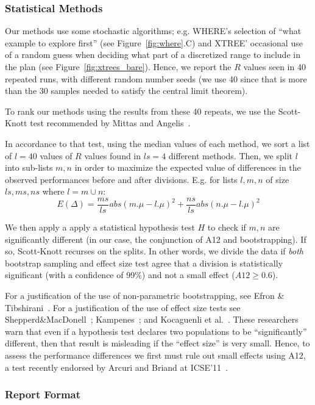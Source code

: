 \documentclass{sig-alternate}
\newcommand{\fig}[1]{Figure~\ref{fig:#1}}
\begin{document}
\subsubsection{Statistical Methods}
Our methods use some stochastic algorithms; e.g. WHERE's selection of ``what example to explore first'' (see \fig{where}.C) and XTREE' occasional use of a random guess when deciding what part of a discretized range to include in the plan (see \fig{xtrees_bare}). Hence, we report the $R$ values seen in 40 repeated runs, with different random number seeds (we use 40 since that is  more than the 30 samples  needed to satisfy the central limit theorem).

To rank our methods using the results from these 40 repeats, we use the Scott-Knott test recommended by Mittas and Angelis~\cite{mittas13}. 

In accordance to that test, using the median values of each method, we
sort a list of  $l=40$ values of $R$ values found in  $ls=4$ different methods. 
Then, we split $l$ into sub-lists $m,n$ in order to maximize the expected value of differences  in the observed performances before and after divisions. E.g. for lists $l,m,n$ of size $ls,ms,ns$ where $l=m\cup n$: \[E(\Delta)=\frac{ms}{ls}abs(m.\mu - l.\mu)^2 + \frac{ns}{ls}abs(n.\mu - l.\mu)^2\]

We then apply a apply a statistical hypothesis test $H$ to check
if $m,n$ are significantly different  (in our case, the conjunction of A12 and bootstrapping). If so, Scott-Knott recurses on the splits. In other words, we divide the data if \textit{both} bootstrap sampling and effect size test agree that a division is statistically significant (with a confidence of 99\%) and not a small effect ($A12 \ge 0.6$).

For a justification of the use of non-parametric bootstrapping, see Efron \& Tibshirani~\cite[p220-223]{efron93}. For a justification of the use of effect size tests see Shepperd\&MacDonell~\cite{shepperd12a}; Kampenes~\cite{kampenes07}; and Kocaguenli et al.~\cite{Kocaguneli2013:ep}. These researchers warn that even if a hypothesis test declares two populations to be ``significantly'' different, then that result is misleading if the ``effect size'' is very small. Hence, to assess the performance differences we first must rule out small effects using A12, a test   recently endorsed by Arcuri and Briand at ICSE'11~\cite{arcuri11}.



\subsubsection{Report Format}
\end{document}
